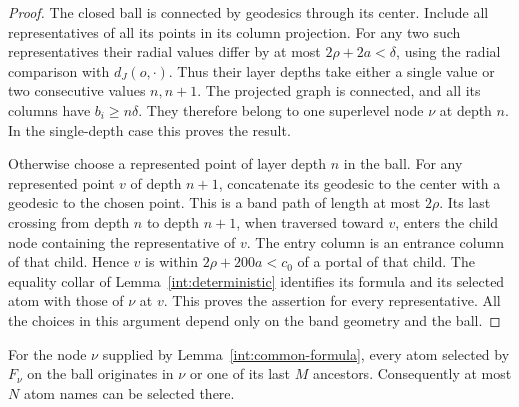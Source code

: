 \begin{proof}
The closed ball is connected by geodesics through its center.  Include
all representatives of all its points in its column projection.  For
any two such representatives their radial values differ by at most
$2\rho+2a<\delta$, using the radial comparison with $d_J(o,\cdot)$.
Thus their layer depths take either a single value or two consecutive
values $n,n+1$.  The projected graph is connected, and all its columns
have $b_i\ge n\delta$.  They therefore belong to one superlevel node
$\nu$ at depth $n$.  In the single-depth case this proves the result.

Otherwise choose a represented point of layer depth $n$ in the ball.
For any represented point $v$ of depth $n+1$, concatenate its geodesic
to the center with a geodesic to the chosen point.  This is a band
path of length at most $2\rho$.  Its last crossing from depth $n$
to depth $n+1$, when traversed toward $v$, enters the child node
containing the representative of $v$.  The entry column is an entrance
column of that child.  Hence $v$ is within
$2\rho+200a<c_0$ of a portal of that child.  The equality collar of
Lemma~\ref{int:deterministic} identifies its formula and its selected
atom with those of $\nu$ at $v$.  This proves the assertion for every
representative.  All the choices in this argument depend only on the
band geometry and the ball.
\end{proof}

\begin{lemma}\label{int:depth}
For the node $\nu$ supplied by Lemma~\ref{int:common-formula}, every
atom selected by $F_\nu$ on the ball originates in $\nu$ or one of
its last $M$ ancestors.  Consequently at most $N$ atom names can be
selected there.
\end{lemma}

